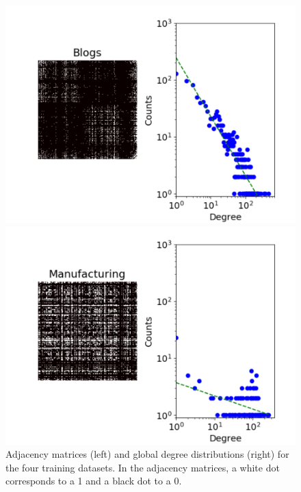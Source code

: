 \begin{figure}[ht!]
\begin{minipage}{0.4\textwidth}
            \includegraphics[width=\textwidth]{img/corpus/blogs_dd}
        \end{minipage}
        \begin{minipage}{0.4\textwidth}
            \includegraphics[width=\textwidth]{img/corpus/manufacturing_dd}
        \end{minipage}
	\caption{Adjacency matrices (left) and global degree distributions (right) for the four training datasets. In the adjacency matrices, a white dot corresponds to a 1 and a black dot to a 0.}
	\label{fig:corpuses}
\end{figure}


